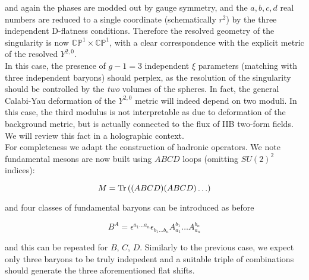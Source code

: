 and again the phases are modded out by gauge symmetry, and the $a, b, c, d$ real numbers are reduced to a single coordinate (schematically $r^2$) by the three independent D-flatness conditions. Therefore the resolved geometry of the singularity is now $\mathbb{CP}^1 \times \mathbb{CP}^1$, with a clear correspondence with the explicit metric of the resolved $Y^{2,0}$.\\

In this case, the presence of $g-1 = 3$ independent $\xi$ parameters (matching with three independent baryons) should perplex, as the resolution of the singularity should be controlled by the \emph{two} volumes of the spheres. In fact, the general Calabi-Yau deformation of the $Y^{2,0}$ metric will indeed depend on two moduli. In this case, the third modulus is not interpretable as due to deformation of the background metric, but is actually connected to the flux of IIB two-form fields. We will review this fact in a holographic context.\\

For completeness we adapt the construction of hadronic operators. We note fundamental mesons are now built using $ABCD$ loops (omitting $SU(2)^2$ indices):

\begin{equation}
	M = \operatorname{Tr} \left( (ABCD)(ABCD) \ldots \right)
	\label{}
\end{equation}

and four classes of fundamental baryons can be introduced as before

\begin{equation}
	B^A = \epsilon^{a_1\ldots a_n}\epsilon_{b_1 \ldots b_n} A^{b_1}_{a_1} \ldots A^{b_n}_{a_n}
	\label{}
\end{equation}

and this can be repeated for $B$, $C$, $D$. Similarly to the previous case, we expect only three baryons to be truly indepedent and a suitable triple of combinations should generate the three aforementioned flat shifts.



